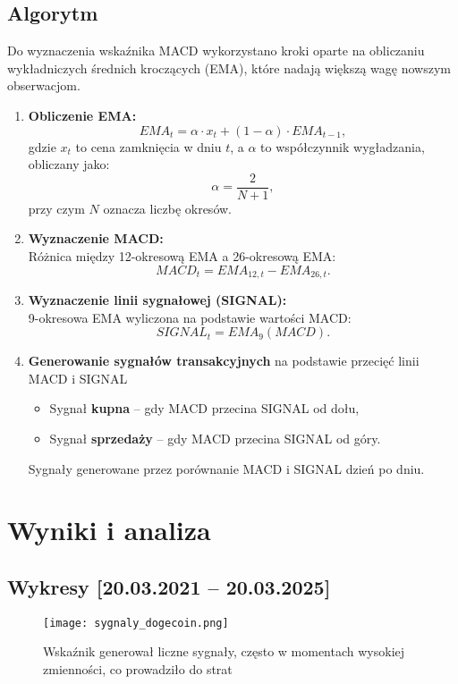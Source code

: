 \documentclass[a4paper,12pt]{article}
\begin{document}
\subsection{Algorytm}
Do wyznaczenia wskaźnika MACD wykorzystano kroki oparte na obliczaniu wykładniczych średnich kroczących (EMA), które nadają większą wagę nowszym obserwacjom.

\begin{enumerate}
    \item \textbf{Obliczenie EMA:} \\
    \[
    EMA_t = \alpha \cdot x_t + (1 - \alpha) \cdot EMA_{t-1},
    \]
    gdzie $x_t$ to cena zamknięcia w dniu $t$, a $\alpha$ to współczynnik wygładzania, obliczany jako:
    \[
    \alpha = \frac{2}{N + 1},
    \]
    przy czym $N$ oznacza liczbę okresów.
    \item \textbf{Wyznaczenie MACD:} \\
    Różnica między 12-okresową EMA a 26-okresową EMA:
    \[
    MACD_t = EMA_{12,t} - EMA_{26,t}.
    \]
    \item \textbf{Wyznaczenie linii sygnałowej (SIGNAL):} \\
    9-okresowa EMA wyliczona na podstawie wartości MACD:
    \[
    SIGNAL_t = EMA_{9}(MACD).
    \]
    \item \textbf{Generowanie sygnałów transakcyjnych}
    na podstawie przecięć linii MACD i SIGNAL
    \begin{itemize}
        \item Sygnał \textbf{kupna} – gdy MACD przecina SIGNAL od dołu,
        \item Sygnał \textbf{sprzedaży} – gdy MACD przecina SIGNAL od góry.
    \end{itemize}
   Sygnały generowane przez porównanie MACD i SIGNAL dzień po dniu.
\end{enumerate}

\section{Wyniki i analiza}
\subsection{Wykresy [20.03.2021 – 20.03.2025]}

\begin{figure}[H]
  \centering
  \texttt{[image: sygnaly\_dogecoin.png]}
  \par\vspace{0.5em}
  \parbox{0.9\textwidth}{\centering\small Wskaźnik generował liczne sygnały, często w momentach wysokiej zmienności, co prowadziło do strat} \\
\end{figure}
\end{document}
